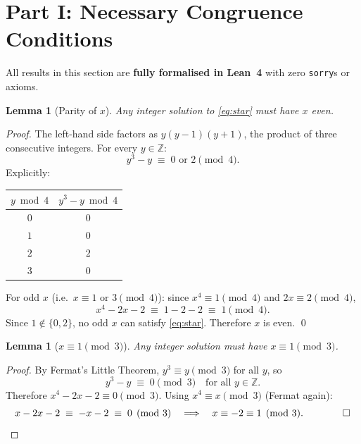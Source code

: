 \documentclass[12pt, a4paper]{article}
\newtheorem{lemma}[theorem]{Lemma}
\theoremstyle{definition}
\newcommand{\Z}{\mathbb{Z}}
\begin{document}
\section{Part I: Necessary Congruence Conditions}\label{sec:congruences}

All results in this section are \textbf{fully formalised in Lean~4} with zero
\texttt{sorry}s or axioms.

\begin{lemma}[Parity of $x$]\label{lem:x_even}
  Any integer solution to \eqref{eq:star} must have $x$ even.
\end{lemma}

\begin{proof}
  The left-hand side factors as $y(y-1)(y+1)$, the product of three consecutive
  integers. For every $y \in \Z$:
  \[
    y^3 - y \;\equiv\; 0 \text{ or } 2 \pmod{4}.
  \]
  Explicitly:
  \begin{center}
  \begin{tabular}{cc}
  \toprule
  $y \bmod 4$ & $y^3 - y \bmod 4$ \\
  \midrule
  $0$ & $0$ \\
  $1$ & $0$ \\
  $2$ & $2$ \\
  $3$ & $0$ \\
  \bottomrule
  \end{tabular}
  \end{center}
  For odd $x$ (i.e.\ $x \equiv 1$ or $3 \pmod{4}$): since $x^4 \equiv 1 \pmod{4}$
  and $2x \equiv 2 \pmod{4}$,
  \[
    x^4 - 2x - 2 \;\equiv\; 1 - 2 - 2 \;\equiv\; 1 \pmod{4}.
  \]
  Since $1 \notin \{0,2\}$, no odd $x$ can satisfy \eqref{eq:star}.
  Therefore $x$ is even. \qed
\end{proof}

\begin{lemma}[$x \equiv 1 \pmod{3}$]\label{lem:x_mod3}
  Any integer solution must have $x \equiv 1 \pmod{3}$.
\end{lemma}

\begin{proof}
  By Fermat's Little Theorem, $y^3 \equiv y \pmod{3}$ for all $y$, so
  \[
    y^3 - y \;\equiv\; 0 \pmod{3} \quad \text{for all } y \in \Z.
  \]
  Therefore $x^4 - 2x - 2 \equiv 0 \pmod{3}$.
  Using $x^4 \equiv x \pmod{3}$ (Fermat again):
  \[
    x - 2x - 2 \;\equiv\; -x - 2 \;\equiv\; 0 \pmod{3}
    \quad\Longrightarrow\quad x \equiv -2 \equiv 1 \pmod{3}. \qquad\qed
  \]
\end{proof}
\end{document}
